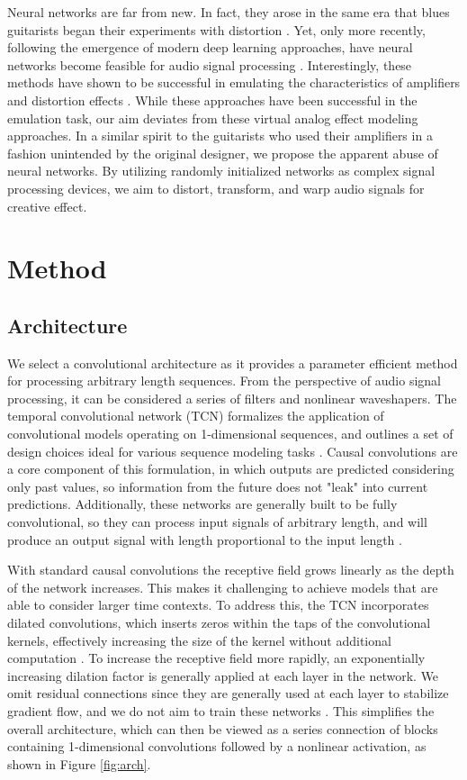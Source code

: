 \documentclass{article}
\begin{document}
Neural networks are far from new. 
In fact, they arose in the same era that blues guitarists began their experiments with distortion \cite{schmidhuber2015deep}.
Yet, only more recently, following the emergence of modern deep learning approaches, 
have neural networks become feasible for audio signal processing \cite{purwins2019deep}.
Interestingly, these methods have shown to be successful in emulating the characteristics of amplifiers and distortion effects 
\cite{schmitz2018nonlinear, zhang2018lstm, damskagg2019distortion, martinez2019nonlinear}.
While these approaches have been successful in the emulation task, our aim deviates from these virtual analog effect modeling approaches.
In a similar spirit to the guitarists who used their amplifiers in a fashion unintended by the original designer,
we propose the apparent abuse of neural networks.
By utilizing randomly initialized networks as complex signal processing devices,
we aim to distort, transform, and warp audio signals for creative effect. 

\section{Method}
\subsection{Architecture}

We select a convolutional architecture as it provides a parameter efficient method for processing arbitrary length sequences.
From the perspective of audio signal processing, it can be considered a series of filters and nonlinear waveshapers.
The temporal convolutional network (TCN) formalizes the application of convolutional models operating on 1-dimensional sequences,
and outlines a set of design choices ideal for various sequence modeling tasks \cite{bai2018tcn}. 
Causal convolutions are a core component of this formulation, in which outputs are predicted considering only past values,
so information from the future does not "leak" into current predictions. 
Additionally, these networks are generally built to be fully convolutional, 
so they can process input signals of arbitrary length, and will produce an output signal with length proportional to the input length \cite{long2015fcn}.

With standard causal convolutions the receptive field grows linearly as the depth of the network increases. 
This makes it challenging to achieve models that are able to consider larger time contexts. 
To address this, the TCN incorporates dilated convolutions, which inserts zeros within the taps of the convolutional kernels, 
effectively increasing the size of the kernel without additional computation \cite{oord2016wavenet}. 
To increase the receptive field more rapidly, an exponentially increasing dilation factor is generally applied at each layer in the network. 
We omit residual connections since they are generally used at each layer to stabilize gradient flow, and we do not aim to train these networks \cite{he2016deep}.
This simplifies the overall architecture, which can then be viewed as a series connection of blocks containing
1-dimensional convolutions followed by a nonlinear activation, as shown in Figure \ref{fig:arch}. 
\end{document}
